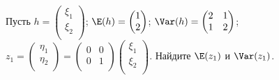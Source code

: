 \documentclass[pdftex,11pt,openany]{book}\usepackage[]{graphicx}\usepackage[]{color}
\begin{document}
\begin{problem}
  Пусть $h =  \begin{pmatrix}
\xi_1 \\
\xi_2 \\
\end{pmatrix} $; $\E (h) =  \begin{pmatrix}
1\\
2\\
\end{pmatrix} $; $\Var (h) =  \begin{pmatrix}
2 & 1 \\
1 & 2 \\
\end{pmatrix} $; $z_1 =  \begin{pmatrix}
\eta_1 \\
\eta_2 \\
\end{pmatrix}  =  \begin{pmatrix}
0 & 0 \\
0 & 1 \\
\end{pmatrix}   \begin{pmatrix}
\xi_1 \\
\xi_2 \\
\end{pmatrix} $. Найдите $\E (z_1)$ и $\Var (z_1)$.
\end{problem}
\end{document}
